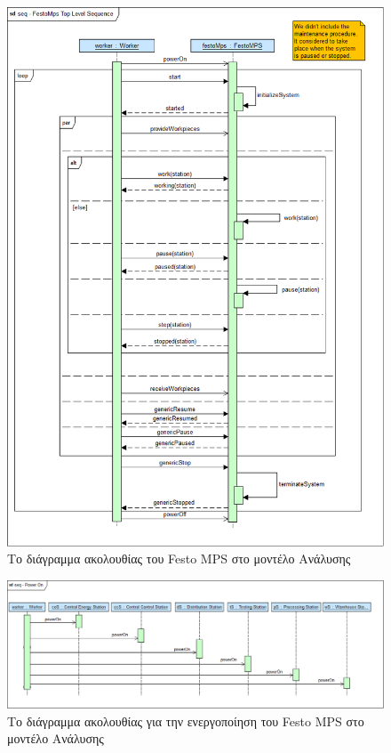 \documentclass[a4paper,12pt,twoside]{report}
\begin{document}
{\begin{appendices}
			\begin{figure}[hp]
					\centering
					\includegraphics[scale=0.30]{AnalysisModel_seq-FestoMpsTopLevelSequence.png}
					\caption{Το διάγραμμα ακολουθίας του Festo MPS στο μοντέλο Ανάλυσης}
					\label{φωτ:Το διάγραμμα ακολουθίας του Festo MPS στο μοντέλο Ανάλυσης}
			\end{figure}
			
			\begin{figure}[hp]
					\centering
					\includegraphics[scale=0.30]{AnalysisModel_seq-PowerOn.png}
					\caption{Το διάγραμμα ακολουθίας για την ενεργοποίηση του Festo MPS στο μοντέλο Ανάλυσης}
					\label{φωτ:Το διάγραμμα ακολουθίας για την ενεργοποίηση του Festo MPS στο μοντέλο Ανάλυσης}
			\end{figure}
			

\end{appendices}}
\end{document}
